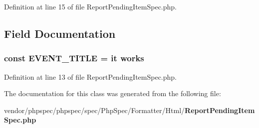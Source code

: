 Definition at line 15 of file Report\+Pending\+Item\+Spec.\+php.



\subsection{Field Documentation}
\subsubsection[{E\+V\+E\+N\+T\+\_\+\+T\+I\+T\+L\+E}]{\setlength{\rightskip}{0pt plus 5cm}const E\+V\+E\+N\+T\+\_\+\+T\+I\+T\+L\+E = \textquotesingle{}it works\textquotesingle{}}\label{classspec_1_1_php_spec_1_1_formatter_1_1_html_1_1_report_pending_item_spec_ac15e1884cc3d167b7fb38cbdc5646050}


Definition at line 13 of file Report\+Pending\+Item\+Spec.\+php.



The documentation for this class was generated from the following file\+:\begin{DoxyCompactItemize}
\item 
vendor/phpspec/phpspec/spec/\+Php\+Spec/\+Formatter/\+Html/{\bf Report\+Pending\+Item\+Spec.\+php}\end{DoxyCompactItemize}

